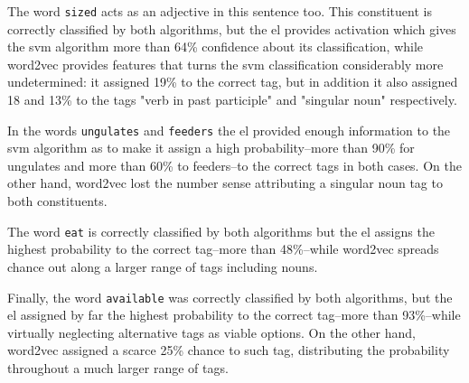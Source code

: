 {The word \texttt{sized} acts as an adjective in this sentence too. This constituent is correctly classified by both algorithms, but the \gls{el} provides activation which gives the \gls{svm} algorithm more than 64\% confidence about its classification, while word2vec provides features that turns the \gls{svm} classification considerably more undetermined: it assigned 19\% to the correct tag, but in addition it also assigned 18 and 13\% to the tags "verb in past participle" and "singular noun" respectively.

In the words \texttt{ungulates} and \texttt{feeders} the \gls{el} provided enough information to the \gls{svm} algorithm as to make it assign a high probability--more than 90\% for ungulates and more than 60\% to feeders--to the correct tags in both cases. On the other hand, word2vec lost the number sense attributing a singular noun tag to both constituents.

The word \texttt{eat} is correctly classified by both algorithms but the \gls{el} assigns the highest probability to the correct tag--more than 48\%--while word2vec spreads chance out along a larger range of tags including nouns.

Finally, the word \texttt{available} was correctly classified by both algorithms, but the \gls{el} assigned by far the highest probability to the correct tag--more than 93\%--while virtually neglecting alternative tags as viable options. On the other hand, word2vec assigned a scarce 25\% chance to such tag, distributing the probability throughout a much larger range of tags.
}

























